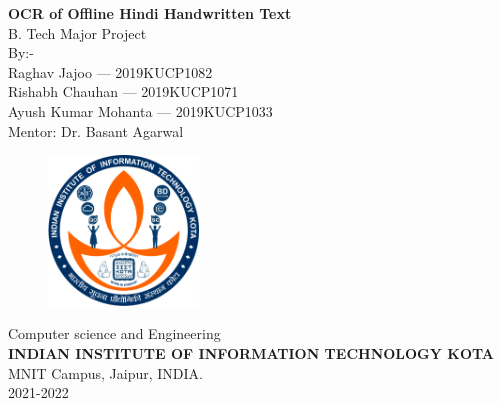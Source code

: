 \documentclass{iiitkthesis}
\begin{document}

\begin{titlepage}
    \begin{center}
        {\Large  \bfseries OCR of Offline Hindi Handwritten Text}\\

        \vfill
        B. Tech Major Project\\

        \vfill
        By:-\\
        Raghav Jajoo --- 2019KUCP1082\\
        Rishabh Chauhan --- 2019KUCP1071\\
        Ayush Kumar Mohanta --- 2019KUCP1033\\

        \vfill
        Mentor: Dr. Basant Agarwal\\

        \vfill
        \begin{figure}[h]
            \centering
            \includegraphics[width=40mm]{figures/IIITKota.png}
        \end{figure}

        \vfill
        Computer science and Engineering\\
        \textbf{INDIAN INSTITUTE OF INFORMATION TECHNOLOGY KOTA}\\
        MNIT Campus, Jaipur, INDIA.\\
        2021-2022

    \end{center}
\end{titlepage}
  




\end{document}
